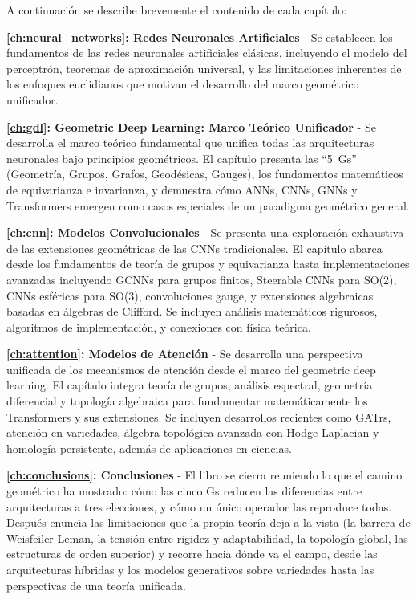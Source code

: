 A continuación se describe brevemente el contenido de cada capítulo:

\textbf{\autoref{ch:neural_networks}: Redes Neuronales Artificiales} - Se establecen los fundamentos de las redes neuronales artificiales clásicas, incluyendo el modelo del perceptrón, teoremas de aproximación universal, y las limitaciones inherentes de los enfoques euclidianos que motivan el desarrollo del marco geométrico unificador.

\textbf{\autoref{ch:gdl}: Geometric Deep Learning: Marco Teórico Unificador} - Se desarrolla el marco teórico fundamental que unifica todas las arquitecturas neuronales bajo principios geométricos. El capítulo presenta las ``5~Gs'' (Geometría, Grupos, Grafos, Geodésicas, Gauges), los fundamentos matemáticos de equivarianza e invarianza, y demuestra cómo \glspl{ANN}, \glspl{CNN}, \glspl{GNN} y \glspl{Transformer} emergen como casos especiales de un paradigma geométrico general.

\textbf{\autoref{ch:cnn}: Modelos Convolucionales} - Se presenta una exploración exhaustiva de las extensiones geométricas de las \glspl{CNN} tradicionales. El capítulo abarca desde los fundamentos de teoría de grupos y equivarianza hasta implementaciones avanzadas incluyendo \glspl{GCNN} para grupos finitos, Steerable \glspl{CNN} para SO(2), \glspl{CNN} esféricas para SO(3), convoluciones gauge, y extensiones algebraicas basadas en álgebras de Clifford. Se incluyen análisis matemáticos rigurosos, algoritmos de implementación, y conexiones con física teórica.

\textbf{\autoref{ch:attention}: Modelos de Atención} - Se desarrolla una perspectiva unificada de los mecanismos de atención desde el marco del geometric deep learning. El capítulo integra teoría de grupos, análisis espectral, geometría diferencial y topología algebraica para fundamentar matemáticamente los \glspl{Transformer} y sus extensiones. Se incluyen desarrollos recientes como \glspl{GATr}, atención en variedades, álgebra topológica avanzada con Hodge Laplacian y homología persistente, además de aplicaciones en ciencias.

\textbf{\autoref{ch:conclusions}: Conclusiones} - El libro se cierra reuniendo lo que el camino geométrico ha mostrado: cómo las cinco Gs reducen las diferencias entre arquitecturas a tres elecciones, y cómo un único operador las reproduce todas. Después enuncia las limitaciones que la propia teoría deja a la vista (la barrera de Weisfeiler-Leman, la tensión entre rigidez y adaptabilidad, la topología global, las estructuras de orden superior) y recorre hacia dónde va el campo, desde las arquitecturas híbridas y los modelos generativos sobre variedades hasta las perspectivas de una teoría unificada.

